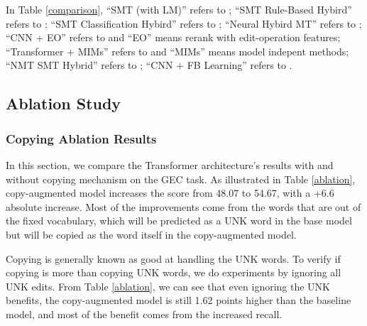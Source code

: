 \documentclass[11pt,a4paper]{article}
\begin{document}
In Table \ref{comparison}, ``SMT (with LM)'' refers to \cite{junczys2014amu}; ``SMT Rule-Based Hybird'' refers to \cite{felice2014grammatical}; ``SMT Classification Hybird'' refers to \cite{rozovskaya2016grammatical}; ``Neural Hybird MT'' refers to \cite{ji2017nested}; ``CNN + EO'' refers to \cite{chollampatt2018multilayer} and ``EO'' means rerank with edit-operation features; ``Transformer + MIMs'' refers to \cite{junczys2018approaching} and ``MIMs'' means model indepent methods; ``NMT SMT Hybrid'' refers to \cite{grundkiewicz2018near}; ``CNN + FB Learning'' refers to \cite{ge2018reaching}. 


\subsection{Ablation Study}

\subsubsection{Copying Ablation Results}

In this section, we compare the Transformer architecture's results with and without copying mechanism on the GEC task. As illustrated in Table \ref{ablation}, copy-augmented model increases the  score from 48.07 to 54.67, with a +6.6 absolute increase. Most of the improvements come from the words that are out of the fixed vocabulary, which will be predicted as a UNK word in the base model but will be copied as the word itself in the copy-augmented model. 

Copying is generally known as good at handling the UNK words. To verify if copying is more than copying UNK words, we do experiments by ignoring all UNK edits. From Table \ref{ablation}, we can see that even ignoring the UNK benefits, the copy-augmented model is still 1.62  points higher than the baseline model, and most of the benefit comes from the increased recall.  
\end{document}
